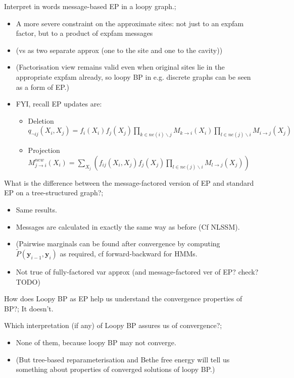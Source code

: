 \documentclass{article}
\begin{document}
Interpret in words message-based EP in a loopy graph.; \begin{itemize}
    \item A more severe constraint on the approximate sites: not just to an expfam factor, but to a product of expfam messages
    \item (vs as two separate approx (one to the site and one to the cavity))
    \item (Factorisation view remains valid even when original sites lie in the appropriate expfam already, so loopy BP in e.g. discrete graphs can be seen as a form of EP.)
    \item FYI, recall EP updates are: \begin{itemize}
        \item Deletion $q_{\neg ij}(X_i, X_j) = f_i(X_i)f_j(X_j)\prod_{k\in ne(i)\backslash j}M_{k\rightarrow i}(X_i)\prod_{l\in ne(j)\backslash i}M_{i\rightarrow j}(X_j)$
        \item Projection $M_{j\rightarrow i}^{new}(X_i) = \sum_{X_j}(f_{ij}(X_i, X_j)f_j(X_j)\prod_{l\in ne(j)\backslash i}M_{l\rightarrow j}(X_j))$
    \end{itemize}
\end{itemize}

What is the difference between the message-factored version of EP and standard EP on a tree-structured graph?; \begin{itemize}
    \item Same results. 
    \item Messages are calculated in exactly the same way as before (Cf NLSSM).
    \item (Pairwise marginals can be found after convergence by computing $\tilde{P}(\mathbf{y}_{i-1}, \mathbf{y}_i)$ as required, cf forward-backward for HMMs.
    \item Not true of fully-factored var approx (and message-factored ver of EP? check? TODO)
\end{itemize}

How does Loopy BP as EP help us understand the convergence properties of BP?; It doesn't.

Which interpretation (if any) of Loopy BP assures us of convergence?; \begin{itemize}
    \item None of them, because loopy BP may not converge. \item (But tree-based reparameterisation and Bethe free energy will tell us something about properties of converged solutions of loopy BP.)
\end{itemize}
\end{document}
